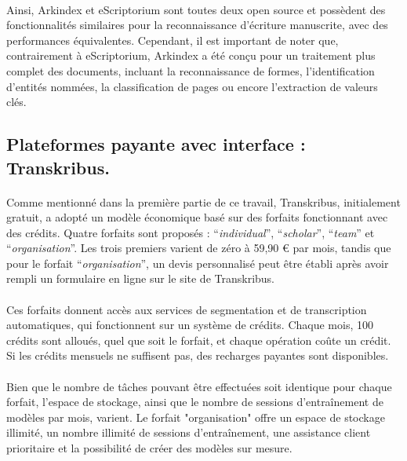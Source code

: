 \documentclass[a4paper,12pt,twoside]{book}
\begin{document}
\paragraph{}
Ainsi, Arkindex et eScriptorium sont toutes deux open source et possèdent des fonctionnalités similaires pour la reconnaissance d’écriture manuscrite, avec des performances équivalentes. Cependant, il est important de noter que, contrairement à eScriptorium, Arkindex a été conçu pour un traitement plus complet des documents, incluant la reconnaissance de formes, l'identification d'entités nommées, la classification de pages ou encore l'extraction de valeurs clés.

		
		\subsection{Plateformes payante avec interface : Transkribus.}

\paragraph{}
Comme mentionné dans la première partie de ce travail, Transkribus, initialement gratuit, a adopté un modèle économique basé sur des forfaits fonctionnant avec des crédits. Quatre forfaits sont proposés : \enquote{\textit{individual}}, \enquote{\textit{scholar}}, \enquote{\textit{team}} et \enquote{\textit{organisation}}. Les trois premiers varient de zéro à 59,90 € par mois, tandis que pour le forfait \enquote{\textit{organisation}}, un devis personnalisé peut être établi après avoir rempli un formulaire en ligne sur le site de Transkribus.

\paragraph{}
Ces forfaits donnent accès aux services de segmentation et de transcription automatiques, qui fonctionnent sur un système de crédits. Chaque mois, 100 crédits sont alloués, quel que soit le forfait, et chaque opération coûte un crédit. Si les crédits mensuels ne suffisent pas, des recharges payantes sont disponibles.

\paragraph{}
Bien que le nombre de tâches pouvant être effectuées soit identique pour chaque forfait, l’espace de stockage, ainsi que le nombre de sessions d'entraînement de modèles par mois, varient. Le forfait "organisation" offre un espace de stockage illimité, un nombre illimité de sessions d'entraînement, une assistance client prioritaire et la possibilité de créer des modèles sur mesure.
\end{document}
